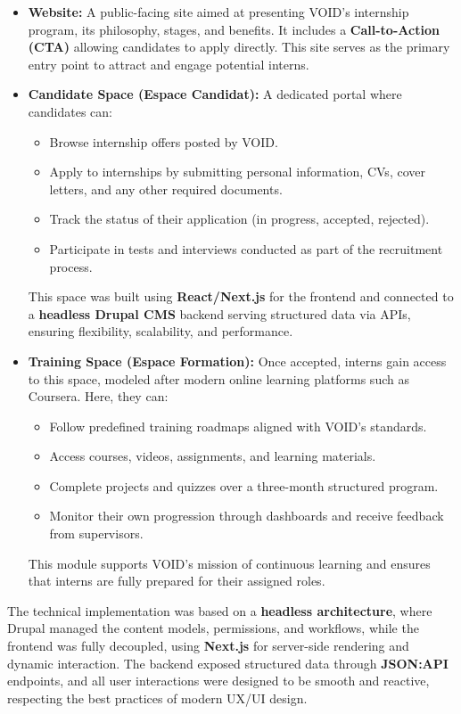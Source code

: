\begin{itemize}
  \item \textbf{Website:} A public-facing site aimed at presenting VOID's internship program, its philosophy, stages, and benefits. It includes a \textbf{Call-to-Action (CTA)} allowing candidates to apply directly. This site serves as the primary entry point to attract and engage potential interns.

  \item \textbf{Candidate Space (Espace Candidat):} A dedicated portal where candidates can:
  \begin{itemize}
    \item Browse internship offers posted by VOID.
    \item Apply to internships by submitting personal information, CVs, cover letters, and any other required documents.
    \item Track the status of their application (in progress, accepted, rejected).
    \item Participate in tests and interviews conducted as part of the recruitment process.
  \end{itemize}
  This space was built using \textbf{React/Next.js} for the frontend and connected to a \textbf{headless Drupal CMS} backend serving structured data via APIs, ensuring flexibility, scalability, and performance.

  \item \textbf{Training Space (Espace Formation):} Once accepted, interns gain access to this space, modeled after modern online learning platforms such as Coursera. Here, they can:
  \begin{itemize}
    \item Follow predefined training roadmaps aligned with VOID's standards.
    \item Access courses, videos, assignments, and learning materials.
    \item Complete projects and quizzes over a three-month structured program.
    \item Monitor their own progression through dashboards and receive feedback from supervisors.
  \end{itemize}
  This module supports VOID's mission of continuous learning and ensures that interns are fully prepared for their assigned roles.
\end{itemize}

\medskip

\noindent
The technical implementation was based on a \textbf{headless architecture}, where Drupal managed the content models, permissions, and workflows, while the frontend was fully decoupled, using \textbf{Next.js} for server-side rendering and dynamic interaction.  
The backend exposed structured data through \textbf{JSON:API} endpoints, and all user interactions were designed to be smooth and reactive, respecting the best practices of modern UX/UI design.

